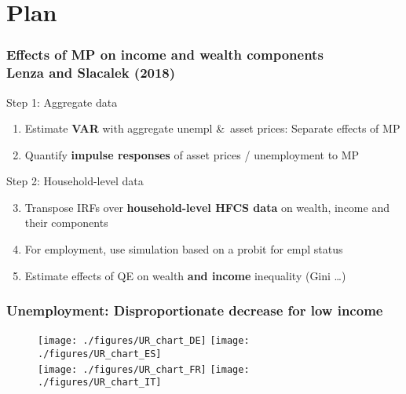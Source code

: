 \documentclass[pdflatex,aspectratio=169]{beamer}
\newcommand{\jemph}[1]{{\color{StataDarkBlue}#1}}
\newcommand{\jbemph}[1]{\textbf{\color{SlideNavy}#1}}
\begin{document}
\section{Plan}
\begin{frame}\frametitle{\bf Effects of MP on income and wealth components\\ \footnotesize{Lenza and Slacalek (2018)}}

\jemph{Step 1: Aggregate data}
\renewcommand*{\theenumi}{\alph{enumi}}
\begin{enumerate}
\item Estimate \jbemph{VAR} with aggregate unempl \&\ asset prices: \jemph{Separate effects of MP}
\item Quantify \jbemph{impulse responses} of asset prices / unemployment to MP\\[5mm] {}
\end{enumerate}
\jemph{Step 2: Household-level data}
\begin{enumerate}
\setcounter{enumi}{2}
\item Transpose IRFs over \jbemph{household-level HFCS data} on wealth, income and their components
\item For employment, use simulation based on a probit for empl status
\item Estimate effects of QE on wealth \jbemph{and income} inequality (Gini \dots)
\end{enumerate}
\renewcommand*{\theenumii}{\Num{enumi}}

\end{frame}



\begin{frame}\frametitle{\bf Unemployment: Disproportionate decrease for low income}

\begin{figure}
\begin{center}
\texttt{[image: ./figures/UR\_chart\_DE]}
\texttt{[image: ./figures/UR\_chart\_ES]}\\
\texttt{[image: ./figures/UR\_chart\_FR]}
\texttt{[image: ./figures/UR\_chart\_IT]}
\end{center}
\end{figure}

\end{frame}
\end{document}

